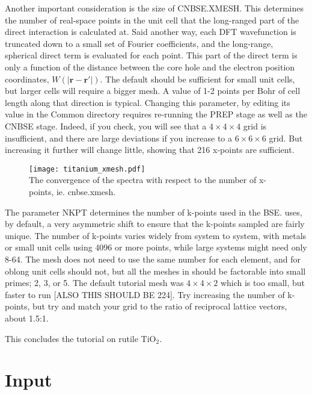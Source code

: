 \documentclass[11pt]{report}
\begin{document}
Another important consideration is the size of CNBSE.XMESH. This determines the number of real-space points in the unit cell that the long-ranged part of the direct interaction is calculated at. Said another way, each DFT wavefunction is truncated down to a small set of Fourier coefficients, and the long-range, spherical direct term is evaluated for each point. This part of the direct term is only a function of the distance between the core hole and the electron position coordinates, $W(|\mathbf{r-r'}|)$. The default should be sufficient for small unit cells, but larger cells will require a bigger mesh. A value of 1-2 points per Bohr of cell length along that direction is typical. 
Changing this parameter, by editing its value in the Common directory requires re-running the PREP stage as well as the CNBSE stage. 
Indeed, if you check, you will see that a $4\times4\times4$ grid is insufficient, and there are large deviations if you increase to a $6\times6\times6$ grid. But increasing it further will change little, showing that 216 x-points are sufficient. 

\begin{figure}
\texttt{[image: titanium\_xmesh.pdf]} \\
The convergence of the spectra with respect to the number of x-points, ie. cnbse.xmesh.
\label{titanium_xmesh}
\end{figure}

The parameter NKPT determines the number of k-points used in the BSE. \OCEAN{} uses, by default, a very asymmetric shift to ensure that the k-points sampled are fairly unique. The number of k-points varies widely from system to system, with metals or small unit cells using 4096 or more points, while large systems might need only 8-64. The mesh does not need to use the same number for each element, and for oblong unit cells should not, but all the meshes in \OCEAN{} should be factorable into small primes; 2, 3, or 5. The default tutorial mesh was $4\times4\times2$ which is too small, but faster to run [ALSO THIS SHOULD BE 224]. Try increasing the number of k-points, but try and match your grid to the ratio of reciprocal lattice vectors, about 1.5:1. 

This concludes the tutorial on rutile TiO$_2$.





\chapter{Input}
\end{document}
